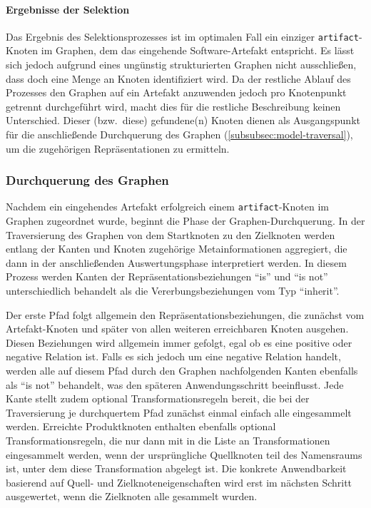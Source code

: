 \paragraph{Ergebnisse der Selektion}

Das Ergebnis des Selektionsprozesses ist im optimalen Fall ein einziger \texttt{artifact}-Knoten im Graphen, dem das eingehende Software-Artefakt entspricht.
Es lässt sich jedoch aufgrund eines ungünstig strukturierten Graphen nicht ausschließen, dass doch eine Menge an Knoten identifiziert wird.
Da der restliche Ablauf des Prozesses den Graphen auf ein Artefakt anzuwenden jedoch pro Knotenpunkt getrennt durchgeführt wird, macht dies für die restliche Beschreibung keinen Unterschied.
Dieser (bzw.\ diese) gefundene(n) Knoten dienen als Ausgangspunkt für die anschließende Durchquerung des Graphen (\autoref{subsubsec:model-traversal}), um die zugehörigen Repräsentationen zu ermitteln.

\subsubsection{Durchquerung des Graphen}\label{subsubsec:model-traversal}

Nachdem ein eingehendes Artefakt erfolgreich einem \texttt{artifact}-Knoten im Graphen zugeordnet wurde, beginnt die Phase der Graphen-Durchquerung.
In der Traversierung des Graphen von dem Startknoten zu den Zielknoten werden entlang der Kanten und Knoten zugehörige Metainformationen aggregiert, die dann in der anschließenden Auswertungsphase interpretiert werden.
In diesem Prozess werden Kanten der Repräsentationsbeziehungen \enquote{is} und \enquote{is not} unterschiedlich behandelt als die Vererbungsbeziehungen vom Typ \enquote{inherit}.

Der erste Pfad folgt allgemein den Repräsentationsbeziehungen, die zunächst vom Artefakt-Knoten und später von allen weiteren erreichbaren Knoten ausgehen.
Diesen Beziehungen wird allgemein immer gefolgt, egal ob es eine positive oder negative Relation ist.
Falls es sich jedoch um eine negative Relation handelt, werden alle auf diesem Pfad durch den Graphen nachfolgenden Kanten ebenfalls als \enquote{is not} behandelt, was den späteren Anwendungsschritt beeinflusst.
Jede Kante stellt zudem optional Transformationsregeln bereit, die bei der Traversierung je durchquertem Pfad zunächst einmal einfach alle eingesammelt werden.
Erreichte Produktknoten enthalten ebenfalls optional Transformationsregeln, die nur dann mit in die Liste an Transformationen eingesammelt werden, wenn der ursprüngliche Quellknoten teil des Namensraums ist, unter dem diese Transformation abgelegt ist.
Die konkrete Anwendbarkeit basierend auf Quell- und Zielknoteneigenschaften wird erst im nächsten Schritt ausgewertet, wenn die Zielknoten alle gesammelt wurden.

